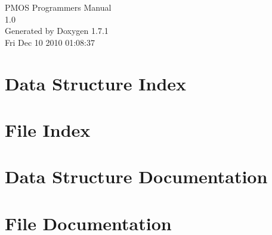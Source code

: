 \documentclass[a4paper]{book}
\begin{document}
\hypersetup{pageanchor=false}
\begin{titlepage}
\vspace*{7cm}
\begin{center}
{\Large PMOS Programmers Manual \\[1ex]\large 1.0 }\\
\vspace*{1cm}
{\large Generated by Doxygen 1.7.1}\\
\vspace*{0.5cm}
{\small Fri Dec 10 2010 01:08:37}\\
\end{center}
\end{titlepage}
\clearemptydoublepage
{}
\tableofcontents
\clearemptydoublepage
{}
\hypersetup{pageanchor=true}
\chapter{Data Structure Index}

\chapter{File Index}

\chapter{Data Structure Documentation}









\chapter{File Documentation}






































\printindex
\end{document}
